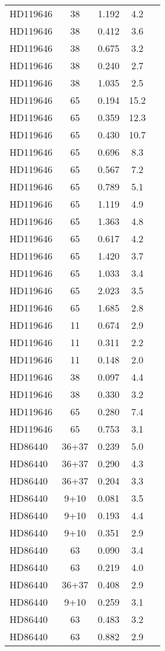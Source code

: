 \begin{table*}
\begin{tabular}{l c c c c}
HD119646 & 38 & 1.192 & 4.2\\ 
HD119646 & 38 & 0.412 & 3.6\\ 
HD119646 & 38 & 0.675 & 3.2\\ 
HD119646 & 38 & 0.240 & 2.7\\ 
HD119646 & 38 & 1.035 & 2.5\\ 
HD119646 & 65 & 0.194 & 15.2\\ 
HD119646 & 65 & 0.359 & 12.3\\ 
HD119646 & 65 & 0.430 & 10.7\\ 
HD119646 & 65 & 0.696 & 8.3\\ 
HD119646 & 65 & 0.567 & 7.2\\ 
HD119646 & 65 & 0.789 & 5.1\\ 
HD119646 & 65 & 1.119 & 4.9\\ 
HD119646 & 65 & 1.363 & 4.8\\ 
HD119646 & 65 & 0.617 & 4.2\\ 
HD119646 & 65 & 1.420 & 3.7\\ 
HD119646 & 65 & 1.033 & 3.4\\ 
HD119646 & 65 & 2.023 & 3.5\\ 
HD119646 & 65 & 1.685 & 2.8\\ 
HD119646 & 11 & 0.674 & 2.9\\ 
HD119646 & 11 & 0.311 & 2.2\\ 
HD119646 & 11 & 0.148 & 2.0\\ 
HD119646 & 38 & 0.097 & 4.4\\ 
HD119646 & 38 & 0.330 & 3.2\\ 
HD119646 & 65 & 0.280 & 7.4\\ 
HD119646 & 65 & 0.753 & 3.1\\ 
\hline
HD86440 & 36+37 & 0.239 & 5.0\\ 
HD86440 & 36+37 & 0.290 & 4.3\\ 
HD86440 & 36+37 & 0.204 & 3.3\\ 
HD86440 & 9+10 & 0.081 & 3.5\\ 
HD86440 & 9+10 & 0.193 & 4.4\\ 
HD86440 & 9+10 & 0.351 & 2.9\\ 
HD86440 & 63 & 0.090 & 3.4\\ 
HD86440 & 63 & 0.219 & 4.0\\ 
HD86440 & 36+37 & 0.408 & 2.9\\ 
HD86440 & 9+10 & 0.259 & 3.1\\ 
HD86440 & 63 & 0.483 & 3.2\\ 
HD86440 & 63 & 0.882 & 2.9\\ 

\end{tabular}
\end{table*}
